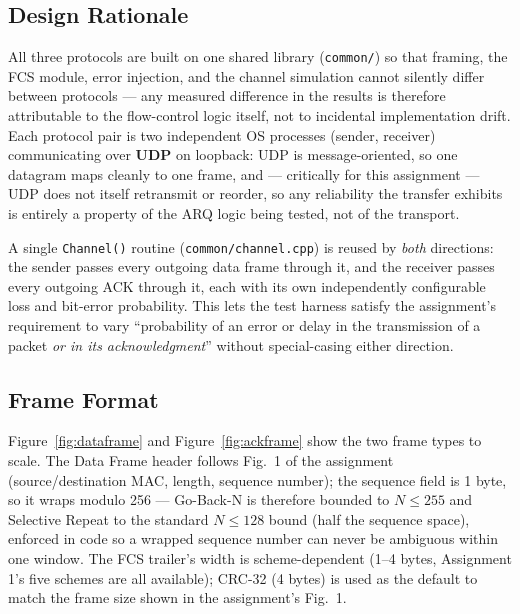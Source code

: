 \documentclass[11pt]{article}
\begin{document}
\subsection{Design Rationale}
All three protocols are built on one shared library (\texttt{common/}) so that framing, the
FCS module, error injection, and the channel simulation cannot silently differ between
protocols — any measured difference in the results is therefore attributable to the flow-control
logic itself, not to incidental implementation drift. Each protocol pair is two independent
OS processes (sender, receiver) communicating over \textbf{UDP} on loopback: UDP is
message-oriented, so one datagram maps cleanly to one frame, and — critically for this
assignment — UDP does not itself retransmit or reorder, so any reliability the transfer
exhibits is entirely a property of the ARQ logic being tested, not of the transport.

A single \texttt{Channel()} routine (\texttt{common/channel.cpp}) is reused by \emph{both}
directions: the sender passes every outgoing data frame through it, and the receiver passes
every outgoing ACK through it, each with its own independently configurable loss and
bit-error probability. This lets the test harness satisfy the assignment's requirement to
vary ``probability of an error or delay in the transmission of a packet \emph{or in its
acknowledgment}'' without special-casing either direction.

\subsection{Frame Format}
Figure~\ref{fig:dataframe} and Figure~\ref{fig:ackframe} show the two frame types to scale.
The Data Frame header follows Fig.~1 of the assignment (source/destination MAC, length,
sequence number); the sequence field is 1 byte, so it wraps modulo 256 — Go-Back-N is
therefore bounded to $N \le 255$ and Selective Repeat to the standard $N \le 128$ bound
(half the sequence space), enforced in code so a wrapped sequence number can never be
ambiguous within one window. The FCS trailer's width is scheme-dependent (1--4 bytes,
Assignment 1's five schemes are all available); CRC-32 (4 bytes) is used as the default
to match the frame size shown in the assignment's Fig.~1.
\end{document}
